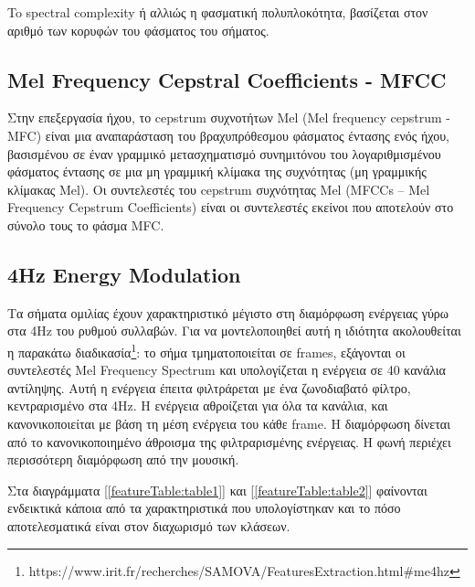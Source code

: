 To spectral complexity ή αλλιώς η φασματική πολυπλοκότητα, βασίζεται στον αριθμό των κορυφών του φάσματος του σήματος.

\subsection{Mel Frequency Cepstral Coefficients - MFCC}

Στην επεξεργασία ήχου, το cepstrum συχνοτήτων Mel (Μel frequency cepstrum - MFC) είναι μια αναπαράσταση του βραχυπρόθεσμου φάσματος έντασης ενός ήχου, βασισμένου σε έναν γραμμικό μετασχηματισμό συνημιτόνου του λογαριθμισμένου φάσματος έντασης σε μια μη γραμμική κλίμακα της συχνότητας (μη γραμμικής κλίμακας Mel).  Οι συντελεστές του cepstrum συχνότητας Mel (MFCCs – Mel Frequency Cepstrum Coefficients) είναι οι συντελεστές εκείνοι που αποτελούν στο σύνολο τους το φάσμα MFC.

\subsection{4Hz Energy Modulation}

Τα σήματα ομιλίας έχουν χαρακτηριστικό μέγιστο στη διαμόρφωση ενέργειας γύρω στα 4Hz του ρυθμού συλλαβών. Για να μοντελοποιηθεί αυτή η ιδιότητα ακολουθείται η παρακάτω διαδικασία\footnote{https://www.irit.fr/recherches/SAMOVA/FeaturesExtraction.html\#me4hz}: το σήμα τμηματοποιείται σε frames, εξάγονται οι συντελεστές Mel Frequency Spectrum και υπολογίζεται η ενέργεια σε 40 κανάλια αντίληψης. Αυτή η ενέργεια έπειτα φιλτράρεται με ένα ζωνοδιαβατό φίλτρο, κεντραρισμένο στα 4Hz. Η ενέργεια αθροίζεται για όλα τα κανάλια, και κανονικοποιείται με βάση τη μέση ενέργεια του κάθε frame. Η διαμόρφωση δίνεται από το κανονικοποιημένο άθροισμα της φιλτραρισμένης ενέργειας. Η φωνή περιέχει περισσότερη διαμόρφωση από την μουσική.

\vspace{1em}
Στα διαγράμματα [\ref{featureTable:table1}] και [\ref{featureTable:table2}] φαίνονται ενδεικτικά κάποια από τα χαρακτηριστικά που υπολογίστηκαν και το πόσο αποτελεσματικά είναι στον διαχωρισμό των κλάσεων.

